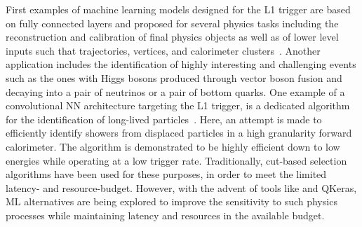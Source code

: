 First examples of machine learning models designed for the L1 trigger are based on fully connected layers and proposed for several physics tasks including the reconstruction and calibration of final physics objects as well as of lower level inputs such that trajectories, vertices, and calorimeter clusters~\cite{CERN-LHCC-2020-004}. Another application includes the identification of highly interesting and challenging events such as the ones with Higgs bosons produced through vector boson fusion and decaying into a pair of neutrinos or a pair of bottom quarks. 
One example of a convolutional NN architecture targeting the L1 trigger, is a dedicated algorithm for the identification of long-lived particles~\cite{Alimena_2020}. Here, an attempt is made to efficiently identify showers from displaced particles in a high granularity forward calorimeter. The algorithm is demonstrated to be highly efficient down to low energies while operating at a low trigger rate.
Traditionally, cut-based selection algorithms have been used for these purposes, in order to meet the limited latency- and resource-budget. However, with the advent of tools like \hlsfml and QKeras, ML alternatives are being explored to improve the sensitivity to such physics processes while maintaining latency and resources in the available budget.


